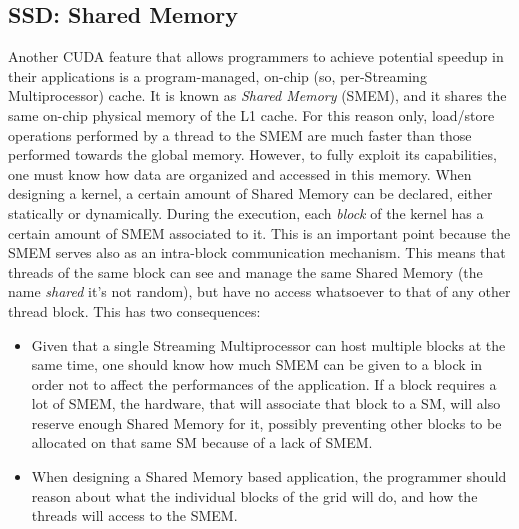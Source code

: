 \documentclass[12pt]{extarticle}
\begin{document}
\subsection{SSD: Shared Memory}
Another CUDA feature that allows programmers to achieve potential speedup in their applications is a program-managed, on-chip (so, per-Streaming Multiprocessor) cache. It is known as \emph{Shared Memory} (SMEM), and it shares the same on-chip physical memory of the L1 cache. For this reason only, load/store operations performed by a thread to the SMEM are much faster than those performed towards the global memory. However, to fully exploit its capabilities, one must know how data are organized and accessed in this memory.\newline
When designing a kernel, a certain amount of Shared Memory can be declared, either statically or dynamically. During the execution, each \emph{block} of the kernel has a certain amount of SMEM associated to it. This is an important point because the SMEM serves also as an intra-block communication mechanism. This means that threads of the same block can see and manage the same Shared Memory (the name \emph{shared} it's not random), but have no access whatsoever to that of any other thread block. This has two consequences:
\begin{itemize}
    \item Given that a single Streaming Multiprocessor can host multiple blocks at the same time, one should know how much SMEM can be given to a block in order not to affect the performances of the application. If a block requires a lot of SMEM, the hardware, that will associate that block to a SM, will also reserve enough Shared Memory for it, possibly preventing other blocks to be allocated on that same SM because of a lack of SMEM.
    \item When designing a Shared Memory based application, the programmer should reason about what the individual blocks of the grid will do, and how the threads will access to the SMEM.
\end{itemize}
\end{document}
